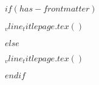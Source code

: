 $if(has-frontmatter)$
  \begin{frontmatter}
    \begin{titlepage}
      $_vline_titlepage.tex()$
    \end{titlepage}
  \end{frontmatter}
$else$
  \begin{titlepage}
    $_vline_titlepage.tex()$
  \end{titlepage}
$endif$

